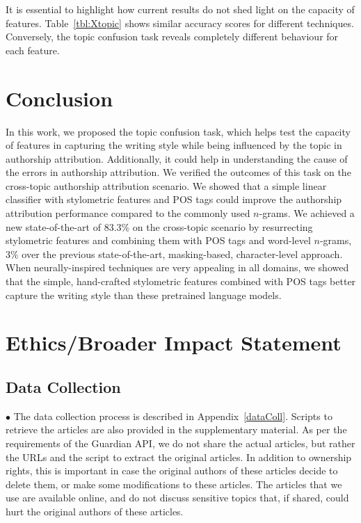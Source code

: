 \documentclass[11pt]{article}
\begin{document}
It is essential to highlight how current results do not shed light on the capacity of features. Table~\ref{tbl:Xtopic} shows similar accuracy scores for different techniques. Conversely, the topic confusion task reveals completely different behaviour for each feature. 

\section{Conclusion}
In this work, we proposed the topic confusion task, which helps test the capacity of features in capturing the writing style while being influenced by the topic in authorship attribution. Additionally, it could help in understanding the cause of the errors in authorship attribution. We verified the outcomes of this task on the cross-topic authorship attribution scenario. We showed that a simple linear classifier with stylometric features and POS tags could improve the authorship attribution performance compared to the commonly used $n$-grams. We achieved a new state-of-the-art of 83.3\% on the cross-topic scenario by resurrecting stylometric features and combining them with POS tags and word-level $n$-grams, 3\% over the previous state-of-the-art, masking-based, character-level approach. When neurally-inspired techniques are very appealing in all domains, we showed that the simple, hand-crafted stylometric features combined with POS tags better capture the writing style than these pretrained language models. 


\newpage
\section{Ethics/Broader Impact Statement}
\subsection{Data Collection}
\noindent$\bullet$ The data collection process is described in Appendix~\ref{dataColl}. Scripts to retrieve the articles are also provided in the supplementary material. As per the requirements of the Guardian API, we do not share the actual articles, but rather the URLs and the script to extract the original articles. In addition to ownership rights, this is important in case the original authors of these articles decide to delete them, or make some modifications to these articles. The articles that we use are available online, and do not discuss sensitive topics that, if shared, could hurt the original authors of these articles. 
\end{document}
